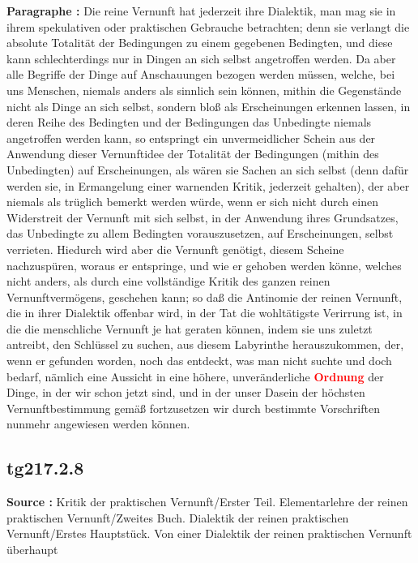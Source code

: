 \documentclass[a4paper,12pt,twoside]{book}
\newcommand{\match}[1]{\textcolor{red}{\textbf{#1}}}
\begin{document}
	\noindent\textbf{Paragraphe : }Die reine Vernunft hat jederzeit ihre Dialektik, man mag sie in ihrem spekulativen oder praktischen Gebrauche betrachten; denn sie verlangt die absolute Totalität der Bedingungen zu einem gegebenen Bedingten, und diese kann schlechterdings nur in Dingen an sich selbst angetroffen werden. Da aber alle Begriffe der Dinge auf Anschauungen bezogen werden müssen, welche, bei uns Menschen, niemals anders als sinnlich sein können, mithin die Gegenstände nicht als Dinge an sich selbst, sondern bloß als Erscheinungen erkennen lassen, in deren Reihe des Bedingten und der Bedingungen das Unbedingte niemals angetroffen werden kann, so entspringt ein unvermeidlicher Schein aus der Anwendung dieser Vernunftidee der Totalität der Bedingungen  (mithin des Unbedingten) auf Erscheinungen, als wären sie Sachen an sich selbst (denn dafür werden sie, in Ermangelung einer warnenden Kritik, jederzeit gehalten), der aber niemals als trüglich bemerkt werden würde, wenn er sich nicht durch einen Widerstreit der Vernunft mit sich selbst, in der Anwendung ihres Grundsatzes, das Unbedingte zu allem Bedingten vorauszusetzen, auf Erscheinungen, selbst verrieten. Hiedurch wird aber die Vernunft genötigt, diesem Scheine nachzuspüren, woraus er entspringe, und wie er gehoben werden könne, welches nicht anders, als durch eine vollständige Kritik des ganzen reinen Vernunftvermögens, geschehen kann; so daß die Antinomie der reinen Vernunft, die in ihrer Dialektik offenbar wird, in der Tat die wohltätigste Verirrung ist, in die die menschliche Vernunft je hat geraten können, indem sie uns zuletzt antreibt, den Schlüssel zu suchen, aus diesem Labyrinthe herauszukommen, der, wenn er gefunden worden, noch das entdeckt, was man nicht suchte und doch bedarf, nämlich eine Aussicht in eine höhere, unveränderliche \match{Ordnung} der Dinge, in der wir schon jetzt sind, und in der unser Dasein der höchsten Vernunftbestimmung gemäß fortzusetzen wir durch bestimmte Vorschriften nunmehr angewiesen werden können. 
	
	\subsection*{tg217.2.8} 
	\textbf{Source : }Kritik der praktischen Vernunft/Erster Teil. Elementarlehre der reinen praktischen Vernunft/Zweites Buch. Dialektik der reinen praktischen Vernunft/Erstes Hauptstück. Von einer Dialektik der reinen praktischen Vernunft überhaupt\\  
	
\end{document}
